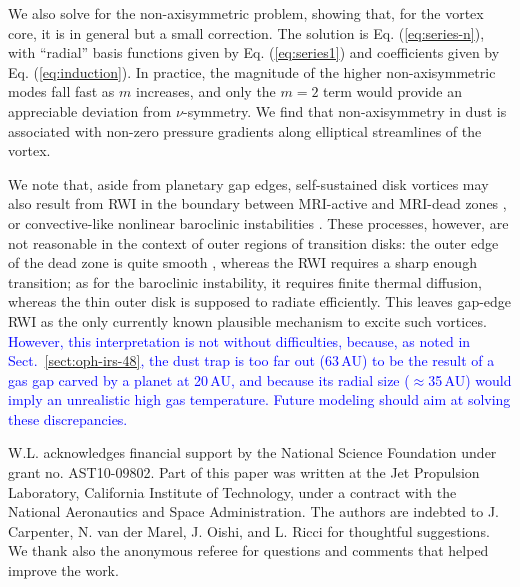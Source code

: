 \documentclass[apj]{emulateapj}
\def\blue#1{\textcolor{blue}{ #1}}
\newcommand{\Eq}[1]{Eq. (\ref{#1})}
\newcommand{\eq}[1]{\Eq{#1}}
\newcommand{\sect}[1]{Sect.~\ref{#1}}
\begin{document}
We also solve for the non-axisymmetric problem, showing that, for the
vortex core, it is in general but a small correction. The solution is
\eq{eq:series-n}, with ``radial'' basis functions given by
\eq{eq:series1} and coefficients given by \eq{eq:induction}. In practice, the magnitude
of the higher non-axisymmetric modes fall fast as $m$ increases, and 
only the $m=2$ term would provide an appreciable deviation from
$\nu$-symmetry. We find that non-axisymmetry in dust 
is associated with non-zero pressure gradients along elliptical streamlines of the vortex.

We note that, aside from planetary gap edges, self-sustained disk
vortices may also result from RWI in the boundary between MRI-active and MRI-dead zones \citep{Varniere-Tagger06,Lyra08,Lyra09a,Lyra-MacLow12}, or
convective-like nonlinear baroclinic instabilities \citep{Klahr-Bodenheimer03,Klahr04,Petersen07a,Petersen07b,Lesur-Papaloizou10,Lyra-Klahr11,Raettig13}. 
These processes, however, are not reasonable in the context of outer
regions of transition disks: the outer edge of the dead zone is quite smooth
\citep{Dzyurkevich13,Landry13}, whereas the RWI requires a 
sharp enough transition; as for the baroclinic instability, it
requires finite thermal diffusion, whereas the thin outer disk
  is supposed to radiate efficiently. This leaves gap-edge RWI as the only currently known
plausible mechanism to excite such vortices. \blue{However, this interpretation 
is not without difficulties, because, as noted in
\sect{sect:oph-irs-48}, the dust trap is too far out (63\,AU) to be
the result of a gas gap carved by a planet at 20\,AU, and because its
radial size ($\approx$35\,AU) would imply an unrealistic high
gas temperature. Future modeling should aim at solving these discrepancies.}


\acknowledgments W.L. acknowledges financial support by the National Science
Foundation under grant no. AST10-09802. Part of this paper was written
at the Jet Propulsion Laboratory, California Institute of Technology, under a contract with the
National Aeronautics and Space Administration. The authors are 
indebted to J. Carpenter, N. van der Marel, J. Oishi, and L. Ricci for thoughtful suggestions. 
We thank also the anonymous referee for questions and comments that helped improve the work.
\end{document}
